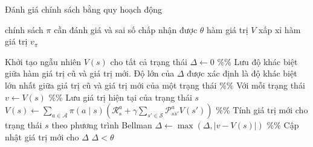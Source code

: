 \begin{algorithm}
	\caption{Đánh giá chính sách bằng quy hoạch động}
	\label{alg_DP}
	\begin{algorithmic}[1]
		\renewcommand{\algorithmicrequire}{\textbf{Đầu vào:}}
		\renewcommand{\algorithmicensure}{\textbf{Đầu ra:}}
		\algnewcommand{}
		\algnewcommand\Operation{\item[\algorithmicoperation]}
		
		\Require chính sách $\pi$ cần đánh giá và sai số chấp nhận được $\theta$
		\Ensure hàm giá trị $V$ xấp xỉ hàm giá trị $v_{\pi}$
		
		\Operation
		\State Khởi tạo ngẫu nhiên $V(s)$ cho tất cả trạng thái
		\Repeat
		\State $\Delta \leftarrow 0$ \%\% Lưu độ khác biệt giữa hàm giá trị cũ và giá trị mới. Độ lớn của $\Delta$ được xác định là độ khác biệt lớn nhất giữa giá trị cũ và giá trị mới của một trạng thái
		 \%\% Với mỗi trạng thái
		\State $v \leftarrow  V(s)$ \%\% Lưu giá trị hiện tại của trạng thái $s$
		\State $V(s) \leftarrow \sum_{a \in \mathcal{A}}^{}\pi(a \mid s)(\mathcal{R}_{s}^{a} + \gamma \sum_{s' \in \mathcal{S}}^{}\mathcal{P}_{ss'}^{a}V(s'))$ \%\% Tính giá trị mới cho trạng thái $s$ theo phương trình Bellman
		\State $\Delta \leftarrow \max(\Delta, \left |v - V(s) \right |)$ \%\% Cập nhật giá trị mới cho $\Delta$
		\EndFor
		\Until $\Delta < \theta$
	\end{algorithmic}
\end{algorithm}


